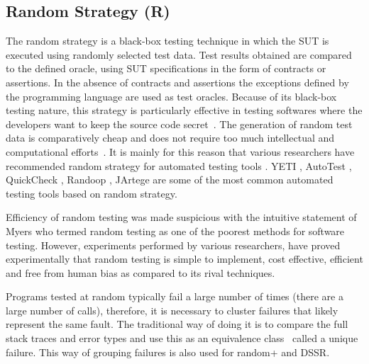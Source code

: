 \documentclass[conference]{IEEEtran}
\begin{document}
\subsection{Random Strategy (R)}
The random strategy is a black-box testing technique in which the SUT is executed using randomly selected test data. Test results obtained are compared to the defined oracle, using SUT specifications in the form of contracts or assertions. In the absence of contracts and assertions the exceptions defined by the programming language are used as test oracles. Because of its black-box testing nature, this strategy is particularly effective in testing softwares where the developers want to keep the source code secret~\cite{Chen2010}. The generation of random test data is comparatively cheap and does not require too much intellectual and computational efforts~\cite{Ciupa2009, Ciupa2008}. It is mainly for this reason that various researchers have recommended random strategy for automated testing tools \cite{Ciupa2008a}. YETI \cite{Oriol2010a, Oriol2010}, AutoTest \cite{Leitner2007, Ciupa2007}, QuickCheck \cite{Claessen2000}, Randoop \cite{Pacheco2007}, JArtege \cite{Oriat2004} are some of the most common automated testing tools based on random strategy.

\indent Efficiency of random testing was made suspicious with the intuitive statement of Myers \cite{Myers2004} who termed random testing as one of the poorest methods for software testing. However, experiments performed by various researchers, \cite{Ciupa2007, Duran1981, Duran1984, Hamlet1994, Ntafos2001} have proved experimentally that random testing is simple to implement, cost effective, efficient and free from human bias as compared to its rival techniques.

Programs tested at random typically fail a large number of times (there are a large number of calls), therefore, it is necessary to cluster failures that likely represent the same fault. The traditional way of doing it is to compare the full stack traces and error types and use this as an equivalence class~\cite{Ciupa2007,Oriol2012} called a unique failure. This way of grouping failures is also used for random+ and DSSR.
\end{document}
